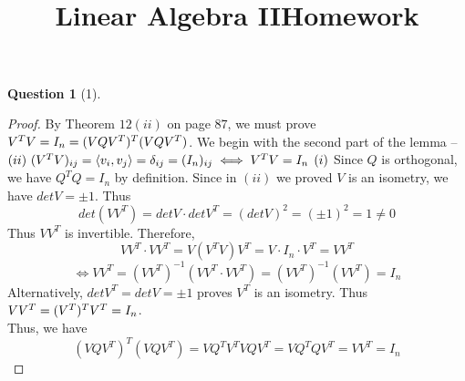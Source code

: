 \documentclass[11pt]{article}
\title{\vspace{-50pt}
\Huge \name
\\\vspace{20pt}
\huge Linear Algebra II\hfill Homework \hw}
\author{}
\date{}
\theoremstyle{quest}
\newtheorem*{question}{Question}
\begin{document}
\maketitle

\begin{question}[1]
\end{question}
\begin{proof}
By Theorem $12(ii)$ on page $87$, we must prove $\\V^TV = I_n = (VQV^T)^T(VQV^T)$. We begin with the second part of the lemma --
$\\(ii)\ (V^TV)_{ij} = \langle v_i, v_j \rangle = \delta_{ij} = (I_n)_{ij} \iff V^TV = I_n$
$\\(i)$ Since $Q$ is orthogonal, we have $Q^TQ = I_n$ by definition.
Since in $(ii)$ we proved $V$ is an isometry, we have $detV = \pm 1$. Thus
$$det(VV^T) = detV \cdot detV^T = (detV)^2 = (\pm 1)^2 = 1 \ne 0$$
Thus $VV^T$ is invertible. Therefore,
$$VV^T \cdot VV^T = V(V^TV)V^T = V \cdot I_n \cdot V^T = VV^T$$
$$\iff VV^T = (VV^T)^{-1} (VV^T \cdot VV^T) = (VV^T)^{-1} (VV^T) = I_n$$Alternatively, $detV^T = detV = \pm 1$ proves $V^T$ is an isometry. Thus $\\VV^T = (V^T)^TV^T = I_n$.
\\Thus, we have
$$(VQV^T)^T(VQV^T) = VQ^TV^TVQV^T = VQ^TQV^T = VV^T = I_n$$
\end{proof}
\end{document}
